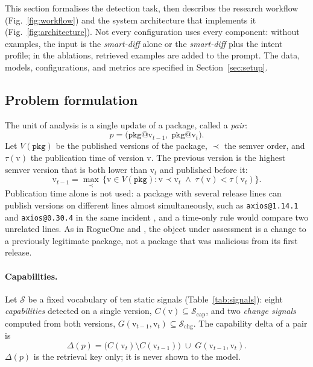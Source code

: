 \documentclass[a4paper,fleqn]{cas-dc}
\begin{document}
This section formalises the detection task, then describes the research
workflow (Fig.~\ref{fig:workflow}) and the system architecture that implements
it (Fig.~\ref{fig:architecture}). Not every configuration uses every
component: without examples, the input is the \emph{smart-diff} alone or the
\emph{smart-diff} plus the intent profile; in the ablations, retrieved examples
are added to the prompt. The data, models, configurations, and metrics are
specified in Section~\ref{sec:setup}.

\subsection{Problem formulation}\label{sec:problem}

The unit of analysis is a single update of a package, called a \emph{pair}:
\begin{equation}
p = \bigl(\texttt{pkg}@\mathrm{v}_{t-1},\; \texttt{pkg}@\mathrm{v}_{t}\bigr).
\label{eq:pair}
\end{equation}
Let $V(\texttt{pkg})$ be the published versions of the package, $\prec$ the
semver order, and $\tau(\mathrm{v})$ the publication time of version
$\mathrm{v}$. The previous version is the highest semver version that is both
lower than $\mathrm{v}_t$ and published before it:
\begin{equation}
\mathrm{v}_{t-1} = \max_{\prec}\,\bigl\{\mathrm{v} \in V(\texttt{pkg}) :
\mathrm{v} \prec \mathrm{v}_t \;\wedge\; \tau(\mathrm{v}) < \tau(\mathrm{v}_t)\bigr\}.
\label{eq:prev}
\end{equation}
Publication time alone is not used: a package with several release lines can
publish versions on different lines almost simultaneously, such as
\texttt{axios@1.14.1} and \texttt{axios@0.30.4} in the same incident
\citep{datadog2026axios}, and a time-only rule would compare two unrelated
lines. As in RogueOne and \citet{wyss2025evaluating}, the object under
assessment is a change to a previously legitimate package, not a package that
was malicious from its first release.

\paragraph{Capabilities.}
Let $\mathcal{S}$ be a fixed vocabulary of ten static signals
(Table~\ref{tab:signals}): eight \emph{capabilities} detected on a single
version, $C(\mathrm{v}) \subseteq \mathcal{S}_{\mathrm{cap}}$, and two
\emph{change signals} computed from both versions,
$G(\mathrm{v}_{t-1}, \mathrm{v}_t) \subseteq \mathcal{S}_{\mathrm{chg}}$.
The capability delta of a pair is
\begin{equation}
\Delta(p) = \bigl(C(\mathrm{v}_t) \setminus C(\mathrm{v}_{t-1})\bigr)
\;\cup\; G(\mathrm{v}_{t-1}, \mathrm{v}_t).
\label{eq:delta}
\end{equation}
$\Delta(p)$ is the retrieval key only; it is never shown to the model.
\end{document}
